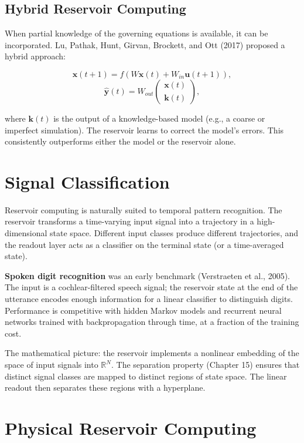 \subsection{Hybrid Reservoir Computing}\label{sec:17.2.3}

When partial knowledge of the governing equations is available, it can be incorporated. Lu, Pathak, Hunt, Girvan, Brockett, and Ott (2017) proposed a hybrid approach:

\[
\mathbf{x}(t+1) = f(W\mathbf{x}(t) + W_{in}\mathbf{u}(t+1)),
\]
\[
\hat{\mathbf{y}}(t) = W_{out}\begin{pmatrix} \mathbf{x}(t) \\ \mathbf{k}(t) \end{pmatrix},
\]

where $\mathbf{k}(t)$ is the output of a knowledge-based model (e.g., a coarse or imperfect simulation). The reservoir learns to correct the model's errors. This consistently outperforms either the model or the reservoir alone.


\bigskip


\section{Signal Classification}\label{sec:17.3}

Reservoir computing is naturally suited to temporal pattern recognition. The reservoir transforms a time-varying input signal into a trajectory in a high-dimensional state space. Different input classes produce different trajectories, and the readout layer acts as a classifier on the terminal state (or a time-averaged state).

\textbf{Spoken digit recognition} was an early benchmark (Verstraeten et al., 2005). The input is a cochlear-filtered speech signal; the reservoir state at the end of the utterance encodes enough information for a linear classifier to distinguish digits. Performance is competitive with hidden Markov models and recurrent neural networks trained with backpropagation through time, at a fraction of the training cost.

The mathematical picture: the reservoir implements a nonlinear embedding of the space of input signals into $\mathbb{R}^N$. The separation property (Chapter 15) ensures that distinct signal classes are mapped to distinct regions of state space. The linear readout then separates these regions with a hyperplane.


\bigskip


\section{Physical Reservoir Computing}\label{sec:17.4}

